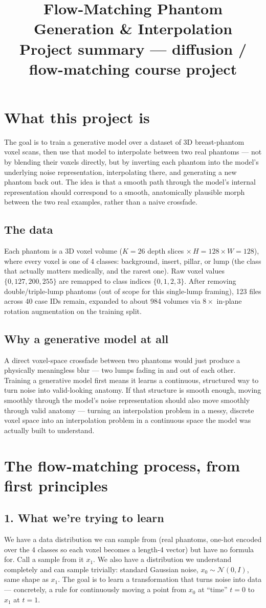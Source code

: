 \documentclass[11pt]{article}
\title{\textbf{Flow-Matching Phantom Generation \& Interpolation}\\[4pt]
\large Project summary --- diffusion / flow-matching course project}
\author{}
\date{}
\newcommand{\hsec}[1]{\section*{\color{hdrblue}#1}}
\newcommand{\hsub}[1]{\subsection*{#1}}
\begin{document}
\maketitle
\vspace{-1.2cm}

\hsec{What this project is}
The goal is to train a generative model over a dataset of 3D breast-phantom voxel scans,
then use that model to interpolate between two real phantoms --- not by blending their
voxels directly, but by inverting each phantom into the model's underlying noise
representation, interpolating there, and generating a new phantom back out. The idea is
that a smooth path through the model's internal representation should correspond to a
smooth, anatomically plausible morph between the two real examples, rather than a naive
crossfade.

\hsub{The data}
Each phantom is a 3D voxel volume ($K{=}26$ depth slices $\times\, H{=}128 \times W{=}128$),
where every voxel is one of 4 classes: background, insert, pillar, or lump (the class that
actually matters medically, and the rarest one). Raw voxel values $\{0,127,200,255\}$ are
remapped to class indices $\{0,1,2,3\}$. After removing double/triple-lump phantoms (out of
scope for this single-lump framing), 123 files across 40 case IDs remain, expanded to about
984 volumes via $8\times$ in-plane rotation augmentation on the training split.

\hsub{Why a generative model at all}
A direct voxel-space crossfade between two phantoms would just produce a physically
meaningless blur --- two lumps fading in and out of each other. Training a generative model
first means it learns a continuous, structured way to turn noise into valid-looking anatomy.
If that structure is smooth enough, moving smoothly through the model's noise representation
should also move smoothly through valid anatomy --- turning an interpolation problem in a
messy, discrete voxel space into an interpolation problem in a continuous space the model was
actually built to understand.

\hsec{The flow-matching process, from first principles}

\hsub{1. What we're trying to learn}
We have a data distribution we can sample from (real phantoms, one-hot encoded over the 4
classes so each voxel becomes a length-4 vector) but have no formula for. Call a sample from
it $x_1$. We also have a distribution we understand completely and can sample trivially:
standard Gaussian noise, $x_0 \sim \mathcal{N}(0, I)$, same shape as $x_1$. The goal is to
learn a transformation that turns noise into data --- concretely, a rule for continuously
moving a point from $x_0$ at ``time'' $t=0$ to $x_1$ at $t=1$.
\end{document}
